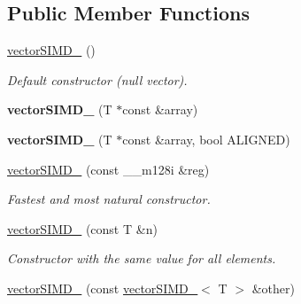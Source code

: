 \subsection*{Public Member Functions}
\begin{DoxyCompactItemize}
\item 
\hyperlink{classirr_1_1vectorSIMD__32_ae789a4c0bc77759804c3683206c4b8e8}{vector\+S\+I\+M\+D\+\_} ()\hypertarget{classirr_1_1vectorSIMD__32_ae789a4c0bc77759804c3683206c4b8e8}{}\label{classirr_1_1vectorSIMD__32_ae789a4c0bc77759804c3683206c4b8e8}

\begin{DoxyCompactList}\small\item\em Default constructor (null vector). \end{DoxyCompactList}\item 
{\bfseries vector\+S\+I\+M\+D\+\_} (T $\ast$const \&array)\hypertarget{classirr_1_1vectorSIMD__32_ab87ad90dca6291677adc7e71186a5655}{}\label{classirr_1_1vectorSIMD__32_ab87ad90dca6291677adc7e71186a5655}

\item 
{\bfseries vector\+S\+I\+M\+D\+\_} (T $\ast$const \&array, bool A\+L\+I\+G\+N\+ED)\hypertarget{classirr_1_1vectorSIMD__32_a89ac23d68463613a04c4c19d8fa7df81}{}\label{classirr_1_1vectorSIMD__32_a89ac23d68463613a04c4c19d8fa7df81}

\item 
\hyperlink{classirr_1_1vectorSIMD__32_a262d7224a5b381a661b62eb361512ed5}{vector\+S\+I\+M\+D\+\_} (const \+\_\+\+\_\+m128i \&reg)\hypertarget{classirr_1_1vectorSIMD__32_a262d7224a5b381a661b62eb361512ed5}{}\label{classirr_1_1vectorSIMD__32_a262d7224a5b381a661b62eb361512ed5}

\begin{DoxyCompactList}\small\item\em Fastest and most natural constructor. \end{DoxyCompactList}\item 
\hyperlink{classirr_1_1vectorSIMD__32_a67bd670b073b57da70c96554aee3e38b}{vector\+S\+I\+M\+D\+\_} (const T \&n)\hypertarget{classirr_1_1vectorSIMD__32_a67bd670b073b57da70c96554aee3e38b}{}\label{classirr_1_1vectorSIMD__32_a67bd670b073b57da70c96554aee3e38b}

\begin{DoxyCompactList}\small\item\em Constructor with the same value for all elements. \end{DoxyCompactList}\item 
\hyperlink{classirr_1_1vectorSIMD__32_a74b1ae6778d8fced1e00386199cbc6c9}{vector\+S\+I\+M\+D\+\_} (const \hyperlink{classirr_1_1vectorSIMD__32}{vector\+S\+I\+M\+D\+\_}$<$ T $>$ \&other)\hypertarget{classirr_1_1vectorSIMD__32_a74b1ae6778d8fced1e00386199cbc6c9}{}\label{classirr_1_1vectorSIMD__32_a74b1ae6778d8fced1e00386199cbc6c9}


\end{DoxyCompactItemize}

